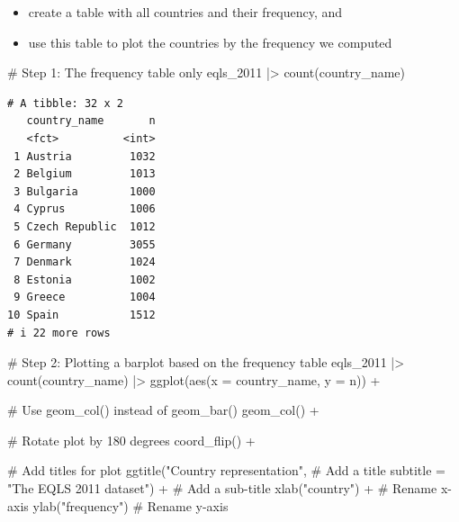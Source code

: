 \documentclass[
  letterpaper,
]{krantz}
\makeatletter
\newenvironment{Shaded}{\begin{snugshade}}{\end{snugshade}}
\newcommand{\AttributeTok}[1]{\textcolor[rgb]{0.40,0.45,0.13}{#1}}
\newcommand{\CommentTok}[1]{\textcolor[rgb]{0.37,0.37,0.37}{#1}}
\newcommand{\FunctionTok}[1]{\textcolor[rgb]{0.28,0.35,0.67}{#1}}
\newcommand{\NormalTok}[1]{\textcolor[rgb]{0.00,0.23,0.31}{#1}}
\newcommand{\SpecialCharTok}[1]{\textcolor[rgb]{0.37,0.37,0.37}{#1}}
\newcommand{\StringTok}[1]{\textcolor[rgb]{0.13,0.47,0.30}{#1}}
\newenvironment{kframe}{%
\medskip{}
\setlength{\fboxsep}{.8em}
 \def\at@end@of@kframe{}%
 \ifinner\ifhmode%
  \def\at@end@of@kframe{\end{minipage}}%
  \begin{minipage}{\columnwidth}%
 \fi\fi%
 \def\FrameCommand##1{\hskip\@totalleftmargin \hskip-\fboxsep
 \colorbox{shadecolor}{##1}\hskip-\fboxsep
     \hskip-\linewidth \hskip-\@totalleftmargin \hskip\columnwidth}%
 \MakeFramed {\advance\hsize-\width
   \@totalleftmargin\z@ \linewidth\hsize
   \@setminipage}}%
 {\par\unskip\endMakeFramed%
 \at@end@of@kframe}
\renewenvironment{Shaded}{\begin{kframe}}{\end{kframe}}
\makeatother
\begin{document}
\begin{itemize}
\item
  create a table with all countries and their frequency, and
\item
  use this table to plot the countries by the frequency we computed
\end{itemize}

\begin{Shaded}
\begin{Highlighting}[]
\CommentTok{\# Step 1: The frequency table only}
\NormalTok{eqls\_2011 }\SpecialCharTok{|\textgreater{}} \FunctionTok{count}\NormalTok{(country\_name)}
\end{Highlighting}
\end{Shaded}

\begin{verbatim}
# A tibble: 32 x 2
   country_name       n
   <fct>          <int>
 1 Austria         1032
 2 Belgium         1013
 3 Bulgaria        1000
 4 Cyprus          1006
 5 Czech Republic  1012
 6 Germany         3055
 7 Denmark         1024
 8 Estonia         1002
 9 Greece          1004
10 Spain           1512
# i 22 more rows
\end{verbatim}

\begin{Shaded}
\begin{Highlighting}[]
\CommentTok{\# Step 2: Plotting a barplot based on the frequency table}
\NormalTok{eqls\_2011 }\SpecialCharTok{|\textgreater{}}
  \FunctionTok{count}\NormalTok{(country\_name) }\SpecialCharTok{|\textgreater{}}
  \FunctionTok{ggplot}\NormalTok{(}\FunctionTok{aes}\NormalTok{(}\AttributeTok{x =}\NormalTok{ country\_name, }\AttributeTok{y =}\NormalTok{ n)) }\SpecialCharTok{+}

  \CommentTok{\# Use geom\_col() instead of geom\_bar()}
  \FunctionTok{geom\_col}\NormalTok{() }\SpecialCharTok{+}
  
  \CommentTok{\# Rotate plot by 180 degrees}
  \FunctionTok{coord\_flip}\NormalTok{() }\SpecialCharTok{+}

  \CommentTok{\# Add titles for plot}
  \FunctionTok{ggtitle}\NormalTok{(}\StringTok{"Country representation"}\NormalTok{,              }\CommentTok{\# Add a title}
          \AttributeTok{subtitle =} \StringTok{"The EQLS 2011 dataset"}\NormalTok{) }\SpecialCharTok{+}  \CommentTok{\# Add a sub{-}title}
  \FunctionTok{xlab}\NormalTok{(}\StringTok{"country"}\NormalTok{) }\SpecialCharTok{+}                          \CommentTok{\# Rename x{-}axis}
  \FunctionTok{ylab}\NormalTok{(}\StringTok{"frequency"}\NormalTok{)                              }\CommentTok{\# Rename y{-}axis  }
\end{Highlighting}
\end{Shaded}
\end{document}
